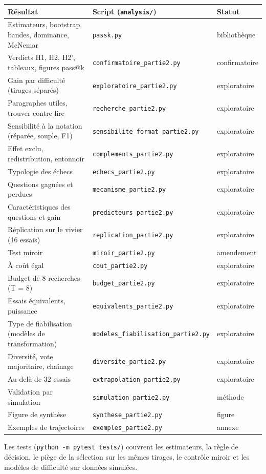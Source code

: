 \begin{center}\small
\begin{tabular}{>{\raggedright\arraybackslash}p{6.2cm}>{\raggedright\arraybackslash}p{5.2cm}l}
\toprule
Résultat & Script (\texttt{analysis/}) & Statut\\
\midrule
Estimateurs, bootstrap, bandes, dominance, McNemar & \texttt{passk.py} & bibliothèque\\
Verdicts H1, H2, H2', tableaux, figures pass@k & \texttt{confirmatoire\_partie2.py} & confirmatoire\\
Gain par difficulté (tirages séparés) & \texttt{exploratoire\_partie2.py} & exploratoire\\
Paragraphes utiles, trouver contre lire & \texttt{recherche\_partie2.py} & exploratoire\\
Sensibilité à la notation (réparée, souple, F1) & \texttt{sensibilite\_format\_partie2.py} & exploratoire\\
Effet exclu, redistribution, entonnoir & \texttt{complements\_partie2.py} & exploratoire\\
Typologie des échecs & \texttt{echecs\_partie2.py} & exploratoire\\
Questions gagnées et perdues & \texttt{mecanisme\_partie2.py} & exploratoire\\
Caractéristiques des questions et gain & \texttt{predicteurs\_partie2.py} & exploratoire\\
Réplication sur le vivier (16 essais) & \texttt{replication\_partie2.py} & exploratoire\\
Test miroir & \texttt{miroir\_partie2.py} & amendement\\
À coût égal & \texttt{cout\_partie2.py} & exploratoire\\
Budget de 8 recherches (T = 8) & \texttt{budget\_partie2.py} & exploratoire\\
Essais équivalents, puissance & \texttt{equivalents\_partie2.py} & exploratoire\\
Type de fiabilisation (modèles de transformation) & \texttt{modeles\_fiabilisation\_partie2.py} & exploratoire\\
Diversité, vote majoritaire, chaînage & \texttt{diversite\_partie2.py} & exploratoire\\
Au-delà de 32 essais & \texttt{extrapolation\_partie2.py} & exploratoire\\
Validation par simulation & \texttt{simulation\_partie2.py} & méthode\\
Figure de synthèse & \texttt{synthese\_partie2.py} & figure\\
Exemples de trajectoires & \texttt{exemples\_partie2.py} & annexe\\
\bottomrule
\end{tabular}
\end{center}
Les tests (\texttt{python -m pytest tests/}) couvrent les estimateurs, la règle de décision, le piège de la sélection sur les mêmes tirages, le contrôle miroir et les modèles de difficulté sur données simulées.
